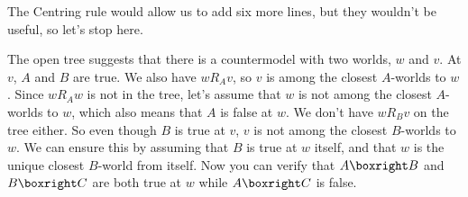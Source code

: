 \begin{center}
\end{center}
The Centring rule would allow us to add six more lines, but they
wouldn't be useful, so let's stop here.

The open tree suggests that there is a countermodel with two worlds, $w$ and
$v$. At $v$, $A$ and $B$ are true. We also have $wR_Av$, so $v$ is among the
closest $A$-worlds to $w$. Since $wR_A w$ is not in the tree, let's assume that
$w$ is not among the closest $A$-worlds to $w$, which also means that $A$ is
false at $w$. We don't have $wR_B v$ on the tree either. So even though $B$ is
true at $v$, $v$ is not among the closest $B$-worlds to $w$. We can ensure this
by assuming that $B$ is true at $w$ itself, and that $w$ is the unique closest
$B$-world from itself. Now you can verify that $A \boxright B$ and
$B \boxright C$ are both true at $w$ while $A \boxright C$ is false.


